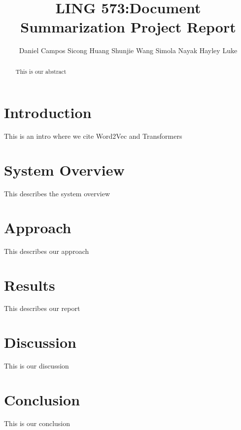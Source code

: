 \documentclass[11pt,a4paper]{article}
\title{LING 573:Document Summarization Project Report}
\author{Daniel Campos \And Sicong Huang \And Shunjie Wang \And Simola Nayak \And Hayley Luke}
\begin{document}
\maketitle
\begin{abstract}
This is our abstract
\end{abstract}
\section{Introduction}
This is an intro where we cite Word2Vec \cite{Mikolov2013DistributedRO} and Transformers \cite{Wolf2019HuggingFacesTS}
\section{System Overview}
This describes the system overview
\section{Approach}
This describes our approach
\section{Results}
This describes our report
\section{Discussion}
This is our discussion
\section{Conclusion}
This is our conclusion


\end{document}
